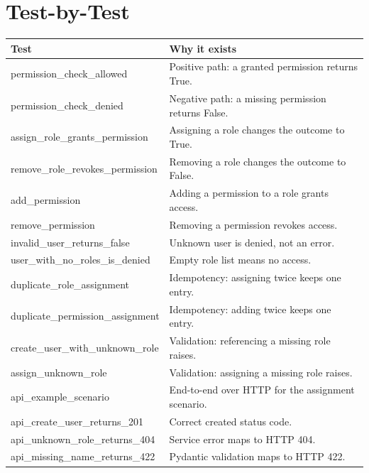 \documentclass[11pt,a4paper]{report}
\begin{document}
\section{Test-by-Test}

\begin{longtable}{p{} p{}}
\textbf{Test} & \textbf{Why it exists} \\
\hline
\endhead
permission\_check\_allowed & Positive path: a granted permission returns True. \\
permission\_check\_denied & Negative path: a missing permission returns False. \\
assign\_role\_grants\_permission & Assigning a role changes the outcome to True. \\
remove\_role\_revokes\_permission & Removing a role changes the outcome to False. \\
add\_permission & Adding a permission to a role grants access. \\
remove\_permission & Removing a permission revokes access. \\
invalid\_user\_returns\_false & Unknown user is denied, not an error. \\
user\_with\_no\_roles\_is\_denied & Empty role list means no access. \\
duplicate\_role\_assignment & Idempotency: assigning twice keeps one entry. \\
duplicate\_permission\_assignment & Idempotency: adding twice keeps one entry. \\
create\_user\_with\_unknown\_role & Validation: referencing a missing role raises. \\
assign\_unknown\_role & Validation: assigning a missing role raises. \\
api\_example\_scenario & End-to-end over HTTP for the assignment scenario. \\
api\_create\_user\_returns\_201 & Correct created status code. \\
api\_unknown\_role\_returns\_404 & Service error maps to HTTP 404. \\
api\_missing\_name\_returns\_422 & Pydantic validation maps to HTTP 422. \\
\end{longtable}
\end{document}
